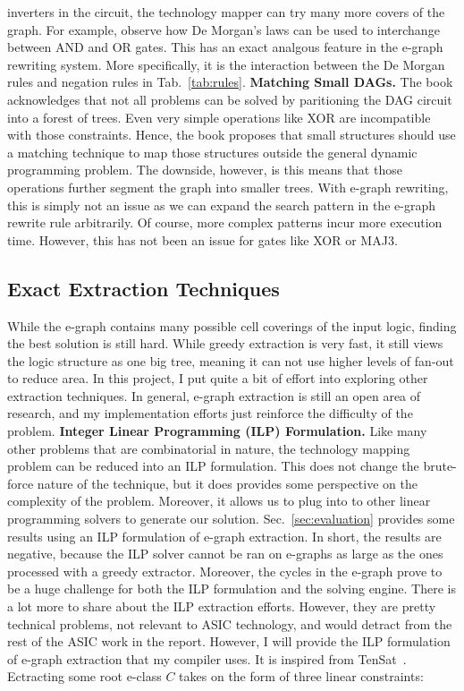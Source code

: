 \documentclass[10pt,letterpaper]{article}
\begin{document}
inverters in the circuit, the technology mapper can try many more covers of the
graph. For example, observe how De Morgan's laws can be used to interchange
between AND and OR gates. This has an exact analgous feature in the e-graph
rewriting system. More specifically, it is the interaction between the De
Morgan rules and negation rules in Tab.~\ref{tab:rules}. \bigbreak{} \noindent
\textbf{Matching Small DAGs.} The book acknowledges that not all problems can
be solved by paritioning the DAG circuit into a forest of trees. Even very
simple operations like XOR are incompatible with those constraints. Hence, the
book proposes that small structures should use a matching technique to map
those structures outside the general dynamic programming problem. The downside,
however, is this means that those operations further segment the graph into
smaller trees. With e-graph rewriting, this is simply not an issue as we can
expand the search pattern in the e-graph rewrite rule arbitrarily. Of course,
more complex patterns incur more execution time. However, this has not been an
issue for gates like XOR or MAJ3.

\subsection{Exact Extraction Techniques}\label{sec:alt:extraction}

While the e-graph contains many possible cell coverings of the input logic,
finding the best solution is still hard. While greedy extraction is very fast,
it still views the logic structure as one big tree, meaning it can not use
higher levels of fan-out to reduce area. In this project, I put quite a bit of
effort into exploring other extraction techniques. In general, e-graph
extraction is still an open area of research, and my implementation efforts
just reinforce the difficulty of the problem. \bigbreak{} \noindent
\textbf{Integer Linear Programming (ILP) Formulation.} Like many other problems
that are combinatorial in nature, the technology mapping problem can be reduced
into an ILP formulation. This does not change the brute-force nature of the
technique, but it does provides some perspective on the complexity of the
problem. Moreover, it allows us to plug into to other linear programming
solvers to generate our solution. Sec.~\ref{sec:evaluation} provides some
results using an ILP formulation of e-graph extraction. In short, the results
are negative, because the ILP solver cannot be ran on e-graphs as large as the
ones processed with a greedy extractor. Moreover, the cycles in the e-graph
prove to be a huge challenge for both the ILP formulation and the solving
engine. There is a lot more to share about the ILP extraction efforts. However,
they are pretty technical problems, not relevant to ASIC technology, and would
detract from the rest of the ASIC work in the report. However, I will provide
the ILP formulation of e-graph extraction that my compiler uses. It is inspired
from TenSat~\cite{ilpextract}. Ectracting some root e-class $C$ takes on the
form of three linear constraints:
\end{document}
